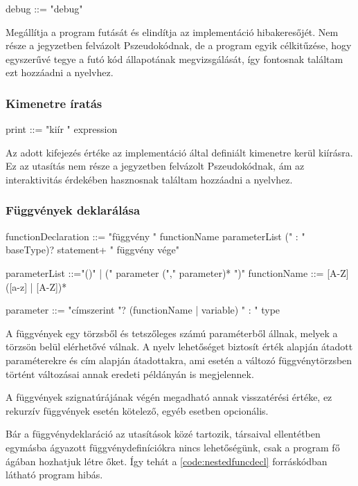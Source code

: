 \begin{ebnf}
debug ::= "debug"
\end{ebnf}

Megállítja a program futását és elindítja az implementáció hibakeresőjét. Nem része a jegyzetben felvázolt Pszeudokódnak, de a program egyik célkitűzése, hogy egyszerűvé tegye a futó kód állapotának megvizsgálását, így fontosnak találtam ezt hozzáadni a nyelvhez.

\subsubsection{Kimenetre íratás}

\begin{ebnf}
print ::= "kiír " expression
\end{ebnf}

Az adott kifejezés értéke az implementáció által definiált kimenetre kerül kiírásra. Ez az utasítás nem része a jegyzetben felvázolt Pszeudokódnak, ám az interaktivitás érdekében hasznosnak találtam hozzáadni a nyelvhez.

\subsubsection{Függvények deklarálása}
\label{sec:funcdecl}

\begin{ebnf}
functionDeclaration ::= 
    "függvény " functionName parameterList (" : " baseType)?
        statement+ 
    " függvény vége"

parameterList ::="()" | (" parameter ("," parameter)* ")"
functionName ::= [A-Z] ([a-z] | [A-Z])*

parameter ::=
    "címszerint "? (functionName | variable) " : " type
\end{ebnf}

A függvények egy törzsből és tetszőleges számú paraméterből állnak, melyek a törzsön belül elérhetővé válnak. A nyelv lehetőséget biztosít érték alapján átadott paraméterekre és cím alapján átadottakra, ami esetén a változó függvénytörzsben történt változásai annak eredeti példányán is megjelennek.

A függvények szignatúrájának végén megadható annak visszatérési értéke, ez rekurzív függvények esetén kötelező, egyéb esetben opcionális.

Bár a függvénydeklaráció az utasítások közé tartozik, társaival ellentétben egymásba ágyazott függvénydefiníciókra nincs lehetőségünk, csak a program fő ágában hozhatjuk létre őket. Így tehát a \ref{code:nestedfuncdecl} forráskódban látható program hibás.

